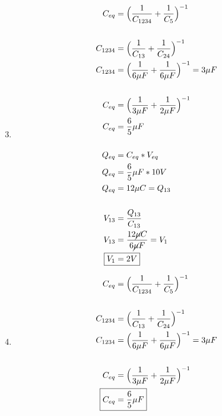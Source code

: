 \documentclass[10pt, twoside]{article}
\begin{document}
	\begin{enumerate}[label=\alph*.]
		\setcounter{enumi}{2}
		\item
			\begin{align*}
				C_{eq} &= \Big{(} \frac{1}{C_{1234}}+ \frac{1}{C_5}  \Big{)}^{-1}\\
				\\
				C_{1234} &= \Big{(} \frac{1}{C_{13}}+ \frac{1}{C_{24}}  \Big{)}^{-1}\\
				C_{1234} &= \Big{(} \frac{1}{6\mu F}+ \frac{1}{6\mu F}  \Big{)}^{-1} = 3\mu F\\
				\\
				C_{eq} &= \Big{(} \frac{1}{3\mu F}+ \frac{1}{2\mu F}  \Big{)}^{-1}\\
				C_{eq} &= \frac{6}{5}\mu F\\
				\\
				Q_{eq} &= C_{eq}*V_{eq}\\
				Q_{eq} &= \frac{6}{5}\mu F*10V\\
				Q_{eq} &= 12\mu C = Q_{13}\\
				\\
				V_{13} &= \frac{Q_{13}}{C_{13}} \\
				V_{13} &= \frac{12\cancel{\mu} C}{6\cancel{\mu} F} = V_1\\
				\Aboxed
				{
					V_1 &= 2V
				}
			\end{align*}
		\item
			\begin{align*}
				C_{eq} &= \Big{(} \frac{1}{C_{1234}}+ \frac{1}{C_5}  \Big{)}^{-1}\\
				\\
				C_{1234} &= \Big{(} \frac{1}{C_{13}}+ \frac{1}{C_{24}}  \Big{)}^{-1}\\
				C_{1234} &= \Big{(} \frac{1}{6\mu F}+ \frac{1}{6\mu F}  \Big{)}^{-1} = 3\mu F\\
				\\
				C_{eq} &= \Big{(} \frac{1}{3\mu F}+ \frac{1}{2\mu F}  \Big{)}^{-1}\\
				\Aboxed
				{
					C_{eq} &= \frac{6}{5}\mu F
				}
			\end{align*}
	\end{enumerate}
\end{document}

